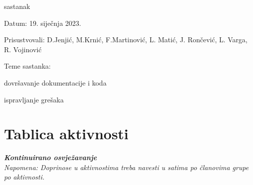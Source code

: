\begin{packed_enum}
\begin{packed_item}
\begin{packed_item}
				\end{packed_item}
			\end{packed_item}
			
			
			
			\item  sastanak
			\item[] \begin{packed_item}
				\item Datum: 19. siječnja 2023.
				\item Prisustvovali: D.Jenjić, M.Krnić, F.Martinović, L. Matić, J. Rončević, L. Varga, R. Vojinović
				\item Teme sastanka:
				\begin{packed_item}
					\item  dovršavanje dokumentacije i koda
					\item  ispravljanje grešaka
				\end{packed_item}
			\end{packed_item}
			
			
			

			
		\end{packed_enum}
		
		\eject
		\section*{Tablica aktivnosti}
		
			\textbf{\textit{Kontinuirano osvježavanje}}\\
			
			 \textit{Napomena: Doprinose u aktivnostima treba navesti u satima po članovima grupe po aktivnosti.}

